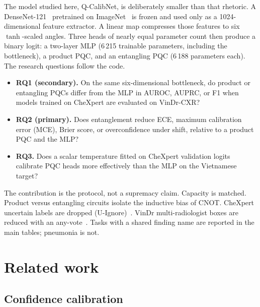 \documentclass[11pt,a4paper]{article}
\begin{document}
The model studied here, Q-CalibNet, is deliberately smaller than that rhetoric. A DenseNet-121~\citep{huang2017densenet} pretrained on ImageNet~\citep{deng2009imagenet} is frozen and used only as a 1024-dimensional feature extractor. A linear map compresses those features to six $\tanh$-scaled angles. Three heads of nearly equal parameter count then produce a binary logit: a two-layer MLP (6\,215 trainable parameters, including the bottleneck), a product PQC, and an entangling PQC (6\,188 parameters each). The research questions follow the code.

\begin{itemize}
\item \textbf{RQ1 (secondary).} On the same six-dimensional bottleneck, do product or entangling PQCs differ from the MLP in AUROC, AUPRC, or F1 when models trained on CheXpert are evaluated on VinDr-CXR?
\item \textbf{RQ2 (primary).} Does entanglement reduce ECE, maximum calibration error (MCE), Brier score, or overconfidence under shift, relative to a product PQC and the MLP?
\item \textbf{RQ3.} Does a scalar temperature fitted on CheXpert validation logits calibrate PQC heads more effectively than the MLP on the Vietnamese target?
\end{itemize}

The contribution is the protocol, not a supremacy claim. Capacity is matched. Product versus entangling circuits isolate the inductive bias of CNOT. CheXpert uncertain labels are dropped (U-Ignore)~\citep{irvin2019chexpert}. VinDr multi-radiologist boxes are reduced with an any-vote~\citep{nguyen2022vindrcxr}. Tasks with a shared finding name are reported in the main tables; pneumonia is not.

\section{Related work}

\subsection{Confidence calibration}
\end{document}
